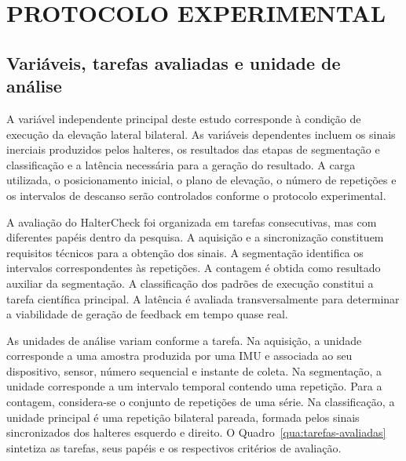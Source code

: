 \chapter{\MakeUppercase{Protocolo experimental}}
\label{cap:metodologia}

\section{Variáveis, tarefas avaliadas e unidade de análise}
\label{sec:tarefas-avaliadas}

A variável independente principal deste estudo corresponde à condição de
execução da elevação lateral bilateral. As variáveis dependentes incluem
os sinais inerciais produzidos pelos halteres, os resultados das etapas
de segmentação e classificação e a latência necessária para a geração
do resultado. A carga utilizada, o posicionamento inicial, o plano de
elevação, o número de repetições e os intervalos de descanso serão
controlados conforme o protocolo experimental.

A avaliação do HalterCheck foi organizada em tarefas consecutivas, mas
com diferentes papéis dentro da pesquisa. A aquisição e a sincronização
constituem requisitos técnicos para a obtenção dos sinais. A segmentação
identifica os intervalos correspondentes às repetições. A contagem é
obtida como resultado auxiliar da segmentação. A classificação dos
padrões de execução constitui a tarefa científica principal. A latência
é avaliada transversalmente para determinar a viabilidade de geração de
feedback em tempo quase real.

As unidades de análise variam conforme a tarefa. Na aquisição, a unidade
corresponde a uma amostra produzida por uma IMU e associada ao seu
dispositivo, sensor, número sequencial e instante de coleta. Na
segmentação, a unidade corresponde a um intervalo temporal contendo uma
repetição. Para a contagem, considera-se o conjunto de repetições de uma
série. Na classificação, a unidade principal é uma repetição bilateral
pareada, formada pelos sinais sincronizados dos halteres esquerdo e
direito. O Quadro~\ref{qua:tarefas-avaliadas} sintetiza as tarefas, seus
papéis e os respectivos critérios de avaliação.


